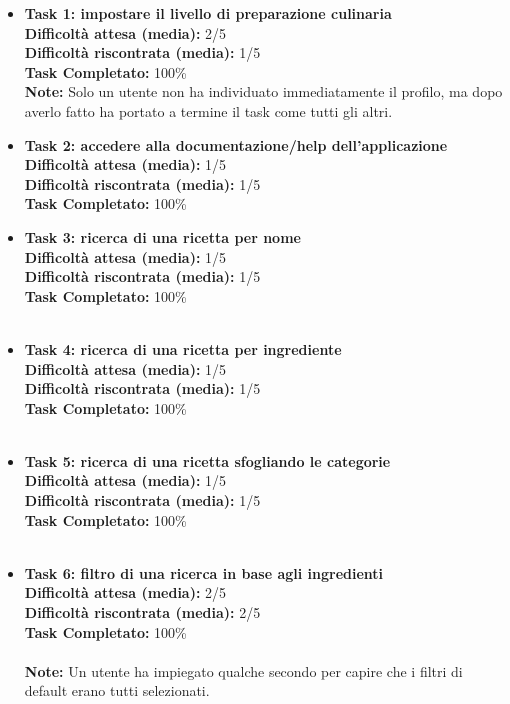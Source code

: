 \begin{itemize}

\item 
\textbf{Task 1: impostare il livello di preparazione culinaria}\\
\textbf{Difficoltà attesa (media):} 2/5\\
\textbf{Difficoltà riscontrata (media):} 1/5\\
\textbf{Task Completato:} 100\%\\
\textbf{Note:} Solo un utente non ha individuato immediatamente il
profilo, ma dopo averlo fatto ha portato a termine il task come tutti
gli altri.\\

\item
\textbf{Task 2: accedere alla documentazione/help dell'applicazione}\\
\textbf{Difficoltà attesa (media):} 1/5\\
\textbf{Difficoltà riscontrata (media):} 1/5\\
\textbf{Task Completato:} 100\%\\

\item
\textbf{Task 3: ricerca di una ricetta per nome}\\
\textbf{Difficoltà attesa (media):} 1/5\\
\textbf{Difficoltà riscontrata (media):} 1/5\\
\textbf{Task Completato:} 100\%\\\\

\item
\textbf{Task 4: ricerca di una ricetta per ingrediente}\\
\textbf{Difficoltà attesa (media):} 1/5\\
\textbf{Difficoltà riscontrata (media):} 1/5\\
\textbf{Task Completato:} 100\%\\\\

\item
\textbf{Task 5: ricerca di una ricetta sfogliando le categorie}\\
\textbf{Difficoltà attesa (media):} 1/5\\
\textbf{Difficoltà riscontrata (media):} 1/5\\
\textbf{Task Completato:} 100\%\\\\

\item
\textbf{Task 6: filtro di una ricerca in base agli ingredienti}\\
\textbf{Difficoltà attesa (media):} 2/5\\
\textbf{Difficoltà riscontrata (media):} 2/5\\
\textbf{Task Completato:} 100\%\\\\
\textbf{Note:} Un utente ha impiegato qualche secondo per capire che i
filtri di default erano tutti selezionati.


\end{itemize}
